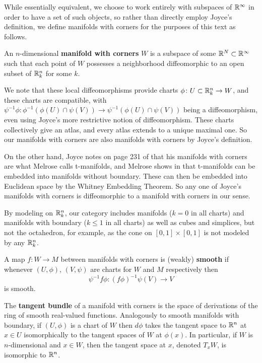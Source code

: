 While essentially equivalent, we choose to work entirely with subspaces of $\mathbb{R}^\infty$ in order to have a set of such objects, so rather than directly employ Joyce's definition, we define manifolds with corners for the purposes of this text as follows.

\begin{definition}\label{D: MWC}
	An $n$-dimensional {\bf manifold with corners} $W$ is a subspace of some $\mathbb{R}^N \subset \mathbb{R}^\infty$ such that each point of $W$ possesses a neighborhood diffeomorphic to an open subset of $\mathbb{R}^n_k$ for some $k$.
\end{definition}

We note that these local diffeomorphisms provide charts $\phi \colon U\subset \mathbb{R}^n_k\to W$, and these charts are compatible, with $\psi^{-1}\phi \colon \phi^{-1}(\phi(U)\cap \psi(V))\to \psi^{-1}(\phi(U)\cap \psi(V))$ being a diffeomorphism, even using Joyce's more restrictive notion of diffeomorphism.
These charts collectively give an atlas, and every atlas extends to a unique maximal one.
So our manifolds with corners are also manifolds with corners by Joyce's definition.

On the other hand, Joyce notes on page 231 of \cite{Joy12} that his manifolds with corners are what Melrose calls t-manifolds, and Melrose shows in \cite[Proposition 1.15.1]{Melrose} that t-manifolds can be embedded into manifolds without boundary.
These can then be embedded into Euclidean space by the Whitney Embedding Theorem.
So any one of Joyce's manifolds with corners is diffeomorphic to a manifold with corners in our sense.

By modeling on $\mathbb{R}^n_k$, our category includes manifolds ($k=0$ in all charts) and manifolds with boundary ($k\leq 1$ in all charts) as well as cubes and simplices, but not the octahedron, for example, as the cone on $[0,1]\times [0,1]$ is not modeled by any $\mathbb{R}^n_k$.

\begin{definition}
	A map $f \colon W\to M$ between manifolds with corners is {(weakly) \bf smooth} if whenever $(U,\phi)$, $(V,\psi)$ are charts for $W$ and $M$ respectively then
	$$\psi^{-1}f \phi \colon (f\phi)^{-1}\psi(V)\to V$$
	is smooth.

	The {\bf tangent bundle} of a manifold with corners is the space of derivations of the ring of smooth real-valued functions.
	Analogously to smooth manifolds with boundary, if $(U,\phi)$ is a chart of $W$ then $d\phi$ takes the tangent space to $\mathbb{R}^n$ at $x\in U$ isomorphically to the tangent spaces of $W$ at $\phi(x)$.
	In particular, if $W$ is $n$-dimensional and $x\in W$, then the tangent space at $x$, denoted $T_xW$, is isomorphic to $\mathbb{R}^n$.
\end{definition}

